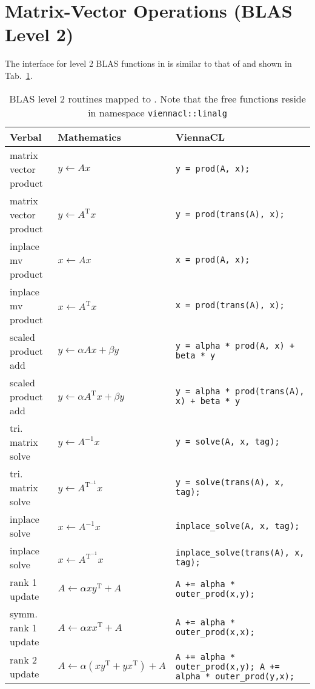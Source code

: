 \section{Matrix-Vector Operations (BLAS Level 2)}
The interface for level 2 BLAS functions in {\ViennaCL} is similar to that of
{\ublas} and shown in Tab.~\ref{tab:blas-level-2}.



\begin{table}[tb]
\begin{center}
\renewcommand{\arraystretch}{1.2}
\begin{tabular}{p{4cm}|l|p{7cm}}
Verbal & Mathematics & ViennaCL\\
\hline
matrix vector product & $y \leftarrow A x$ & \texttt{y = prod(A, x);} \\
matrix vector product & $y \leftarrow A^\mathrm{T} x$ & \texttt{y = prod(trans(A), x);} \\
inplace mv product & $x \leftarrow A x$ & \texttt{x = prod(A, x);} \\
inplace mv product & $x \leftarrow A^\mathrm{T} x$ & \texttt{x = prod(trans(A), x);} \\
\hline
scaled product add & $y \leftarrow \alpha A x + \beta y$ & \texttt{y = alpha * prod(A, x) + beta * y} \\
scaled product add & $y \leftarrow \alpha A^{\mathrm T} x + \beta y$ & \texttt{y = alpha * prod(trans(A), x) + beta * y} \\
\hline
tri. matrix solve & $y \leftarrow A^{-1} x$ & \texttt{y = solve(A, x, tag);} \\
tri. matrix solve & $y \leftarrow A^\mathrm{T^{-1}} x$ & \texttt{y = solve(trans(A), x, tag);} \\
inplace solve & $x \leftarrow A^{-1} x$ & \texttt{inplace\_solve(A, x, tag);} \\
inplace solve & $x \leftarrow A^\mathrm{T^{-1}} x$ & \texttt{inplace\_solve(trans(A), x, tag);} \\
\hline
rank 1 update & $A \leftarrow \alpha x y^{\mathrm T} + A$ & \texttt{A += alpha * outer\_prod(x,y);} \\
symm. rank 1 update & $A \leftarrow \alpha x x^{\mathrm T} + A$ & \texttt{A += alpha * outer\_prod(x,x);} \\
rank 2 update & $A \leftarrow \alpha (x y^{\mathrm T} + y x^{\mathrm T}) + A$ & \texttt{A += alpha * outer\_prod(x,y); A += alpha * outer\_prod(y,x);} \\
\end{tabular}
\caption{BLAS level 2 routines mapped to \ViennaCL. Note that the free functions reside in namespace \texttt{viennacl::linalg}}
\label{tab:blas-level-2}
\end{center}
\end{table}

